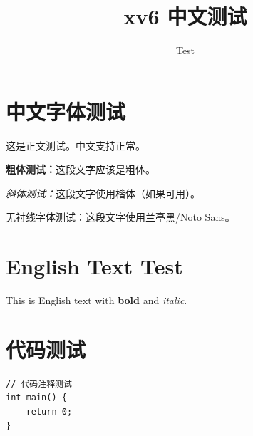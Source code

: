 \documentclass[12pt]{article}
\begin{document}
\title{xv6 中文测试}
\author{Test}
\maketitle

\section{中文字体测试}

这是正文测试。中文支持正常。

\textbf{粗体测试：}这段文字应该是粗体。

\textit{斜体测试：}这段文字使用楷体（如果可用）。

\textsf{无衬线字体测试：}这段文字使用兰亭黑/Noto Sans。

\section{English Text Test}

This is English text with \textbf{bold} and \textit{italic}.

\section{代码测试}

\begin{verbatim}
// 代码注释测试
int main() {
    return 0;
}
\end{verbatim}
\end{document}

